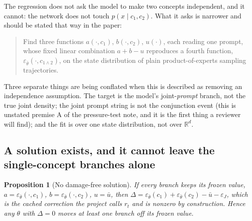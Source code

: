 \documentclass[11pt]{article}
\newcommand{\eps}{\varepsilon}
\newcommand{\epsfr}{\eps_{\bar\theta}}
\newcommand{\R}{\mathbb{R}}
\theoremstyle{plain}
\newtheorem{proposition}{Proposition}
\theoremstyle{remark}
\begin{document}
The regression does not ask the model to make two concepts independent, and it cannot: the network
does not touch $p(x \mid c_1, c_2)$. What it asks is narrower and should be stated that way in the
paper:

\begin{quote}
Find three functions $a(\cdot,c_1)$, $b(\cdot,c_2)$, $u(\cdot)$, each reading one prompt, whose
fixed linear combination $a+b-u$ reproduces a fourth function, $\epsfr(\cdot,c_{1\wedge2})$, on the
state distribution of plain product-of-experts sampling trajectories.
\end{quote}

Three separate things are being conflated when this is described as removing an independence
assumption. The target is the model's joint-\emph{prompt} branch, not the true joint density; the
joint prompt string is not the conjunction event (this is unstated premise A of the pressure-test
note, and it is the first thing a reviewer will find); and the fit is over one state distribution,
not over $\R^d$.

\subsection{A solution exists, and it cannot leave the single-concept branches alone}

\begin{proposition}[No damage-free solution]
\label{prop:damage}
If every branch keeps its frozen value, $a = \epsfr(\cdot,c_1)$, $b = \epsfr(\cdot,c_2)$,
$u = \bar u$, then $\Delta = \epsfr(c_1)+\epsfr(c_2)-\bar u - \eps_J$, which is the cached
correction the project calls $r_t$ and is nonzero by construction. Hence any $\theta$ with
$\Delta = 0$ moves at least one branch off its frozen value.
\end{proposition}
\end{document}
